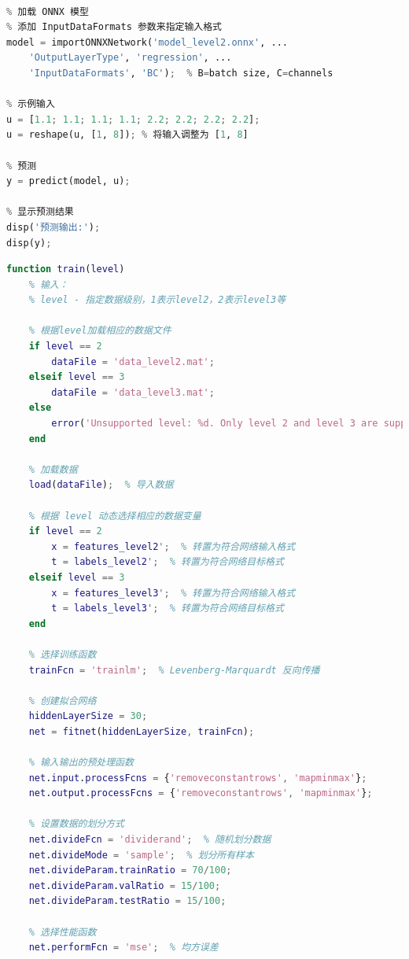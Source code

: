 \documentclass[12pt,a4paper,UTF8]{article}
\begin{document}
\begin{lstlisting}[language=Python,caption=test\_pytorch.m——验证加载pytorch训练模型的可行性]
% 验证加载pytorch训练模型的可行性

% 加载 ONNX 模型
% 添加 InputDataFormats 参数来指定输入格式
model = importONNXNetwork('model_level2.onnx', ...
    'OutputLayerType', 'regression', ...
    'InputDataFormats', 'BC');  % B=batch size, C=channels

% 示例输入
u = [1.1; 1.1; 1.1; 1.1; 2.2; 2.2; 2.2; 2.2];
u = reshape(u, [1, 8]); % 将输入调整为 [1, 8]

% 预测
y = predict(model, u);

% 显示预测结果
disp('预测输出:');
disp(y);
\end{lstlisting}

\begin{lstlisting}[language=Matlab,caption=train.m——使用matlab训练模型的脚本]
function train(level)
    % 输入：
    % level - 指定数据级别，1表示level2，2表示level3等

    % 根据level加载相应的数据文件
    if level == 2
        dataFile = 'data_level2.mat';
    elseif level == 3
        dataFile = 'data_level3.mat';
    else
        error('Unsupported level: %d. Only level 2 and level 3 are supported.', level);
    end
    
    % 加载数据
    load(dataFile);  % 导入数据

    % 根据 level 动态选择相应的数据变量
    if level == 2
        x = features_level2';  % 转置为符合网络输入格式
        t = labels_level2';  % 转置为符合网络目标格式
    elseif level == 3
        x = features_level3';  % 转置为符合网络输入格式
        t = labels_level3';  % 转置为符合网络目标格式
    end

    % 选择训练函数
    trainFcn = 'trainlm';  % Levenberg-Marquardt 反向传播

    % 创建拟合网络
    hiddenLayerSize = 30;
    net = fitnet(hiddenLayerSize, trainFcn);

    % 输入输出的预处理函数
    net.input.processFcns = {'removeconstantrows', 'mapminmax'};
    net.output.processFcns = {'removeconstantrows', 'mapminmax'};

    % 设置数据的划分方式
    net.divideFcn = 'dividerand';  % 随机划分数据
    net.divideMode = 'sample';  % 划分所有样本
    net.divideParam.trainRatio = 70/100;
    net.divideParam.valRatio = 15/100;
    net.divideParam.testRatio = 15/100;

    % 选择性能函数
    net.performFcn = 'mse';  % 均方误差


\end{lstlisting}
\end{document}
